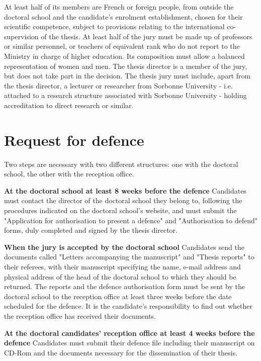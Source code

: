 At least half of its members are French or foreign people, from outside the doctoral school and the candidate's enrolment establishment, chosen for their scientific competence, subject to provisions relating to the international co-supervision of the thesis. At least half of the jury must be made up of professors or similar personnel, or teachers of equivalent rank who do not report to the Ministry in charge of higher education. Its composition must allow a balanced representation of women and men. The thesis director is a member of the jury, but does not take part in the decision.
The thesis jury must include, apart from the thesis director, a lecturer or researcher from Sorbonne University - i.e. attached to a research structure associated with Sorbonne University - holding accreditation to direct research or similar.

\section{Request for defence}
\label{sec:request-for-defence}

Two steps are necessary with two different structures: one with the doctoral school, the other with the reception office. 

\textbf{At the doctoral school at least 8 weeks before the defence}
Candidates must contact the director of the doctoral school they belong to, following the procedures indicated on the doctoral school's website, and must submit the "Application for authorisation to present a defence" and "Authorisation to defend" forms, duly completed and signed by the thesis director.
 
\textbf{When the jury is accepted by the doctoral school}
Candidates send the documents called "Letters accompanying the manuscript" and "Thesis reports" to their referees, with their manuscript specifying the name, e-mail address and physical address of the head of the doctoral school to which they should be returned.
The reports and the defence authorisation form must be sent by the doctoral school to the reception office at least three weeks before the date scheduled for the defence. It is the candidate’s responsibility to find out whether the reception office has received their documents.

\textbf{At the doctoral candidates' reception office at least 4 weeks before the defence}
Candidates must submit their defence file including their manuscript on CD-Rom and the documents necessary for the dissemination of their thesis.

